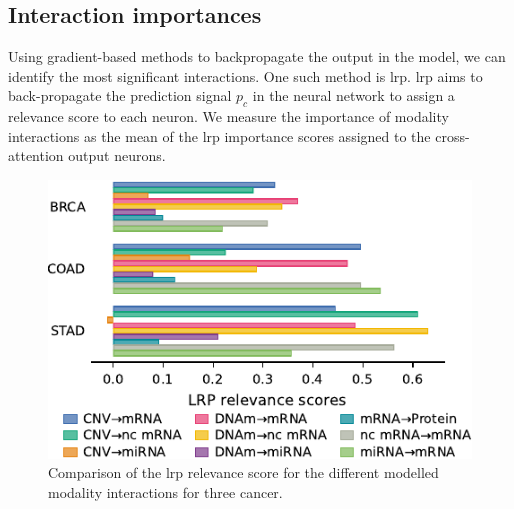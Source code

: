 \documentclass[../main.tex]{subfiles}
\begin{document}
 \subsection{Interaction importances}
     Using gradient-based methods to backpropagate the output in the model, we can identify the most significant interactions.
     One such method is \gls{lrp}.
     \Gls{lrp} aims to back-propagate the prediction signal $p_c$ in the neural network to assign a relevance score to each neuron.
     We measure the importance of modality interactions as the mean of the \gls{lrp} importance scores assigned to the cross-attention output neurons.
     \begin{figure}[htbp]
         \centering
         \includegraphics[width=\linewidth]{LRP_crossattomics_subset.pdf}
         \caption{Comparison of the \gls{lrp} relevance score for the different modelled modality interactions for three cancer.}
         \label{fig:LRP_CrossAttOmics_subset}
     \end{figure}
\end{document}
